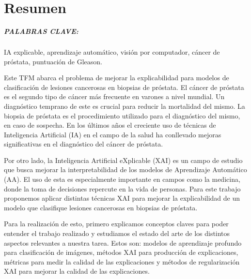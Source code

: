 %


\chapter{Resumen}

\paragraph*{PALABRAS CLAVE:} IA explicable, aprendizaje automático, visión por computador, cáncer de próstata, puntuación de Gleason.

Este TFM abarca el problema de mejorar la explicabilidad para modelos de clasificación de lesiones cancerosas en biopsias de próstata. El cáncer de próstata es el segundo tipo de cáncer más frecuente en varones a nivel mundial. Un diagnóstico temprano de este es crucial para reducir la mortalidad del mismo. La biopsia de próstata es el procedimiento utilizado para el diagnóstico del mismo, en caso de sospecha. En los últimos años el creciente uso de técnicas de Inteligencia Artificial (IA) en el campo de la salud ha conllevado mejoras significativas en el diagnóstico del cáncer de próstata. 

Por otro lado, la Inteligencia Artificial eXplicable (XAI) es un campo de estudio que busca mejorar la interpretabilidad de los modelos de Aprendizaje Automático (AA). El uso de esta es especialmente importante en campos como la medicina, donde la toma de decisiones repercute en la vida de personas. Para este trabajo proponemos aplicar distintas técnicas XAI para mejorar la explicabilidad de un modelo que clasifique lesiones cancerosas en biopsias de próstata.

Para la realización de esto, primero explicamos conceptos claves para poder entender el trabajo realizado y estudiamos el estado del arte de los distintos aspectos relevantes a nuestra tarea. Estos son: modelos de aprendizaje profundo para clasificación de imágenes, métodos XAI para producción de explicaciones, métricas para medir la calidad de las explicaciones y métodos de regularización XAI para mejorar la calidad de las explicaciones.


